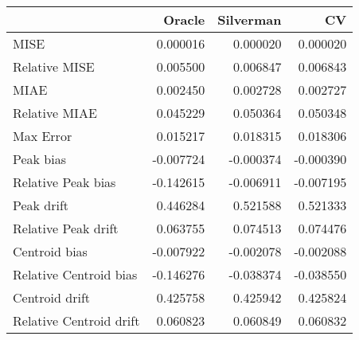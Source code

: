 \begin{tabular}{lrrr}
  \hline
 & Oracle & Silverman & CV \\ 
  \hline
MISE & 0.000016 & 0.000020 & 0.000020 \\ 
  Relative MISE & 0.005500 & 0.006847 & 0.006843 \\ 
  MIAE & 0.002450 & 0.002728 & 0.002727 \\ 
  Relative MIAE & 0.045229 & 0.050364 & 0.050348 \\ 
  Max Error & 0.015217 & 0.018315 & 0.018306 \\ 
  Peak bias & -0.007724 & -0.000374 & -0.000390 \\ 
  Relative Peak bias & -0.142615 & -0.006911 & -0.007195 \\ 
  Peak drift & 0.446284 & 0.521588 & 0.521333 \\ 
  Relative Peak drift & 0.063755 & 0.074513 & 0.074476 \\ 
  Centroid bias & -0.007922 & -0.002078 & -0.002088 \\ 
  Relative Centroid bias & -0.146276 & -0.038374 & -0.038550 \\ 
  Centroid drift & 0.425758 & 0.425942 & 0.425824 \\ 
  Relative Centroid drift & 0.060823 & 0.060849 & 0.060832 \\ 
   \hline
\end{tabular}
